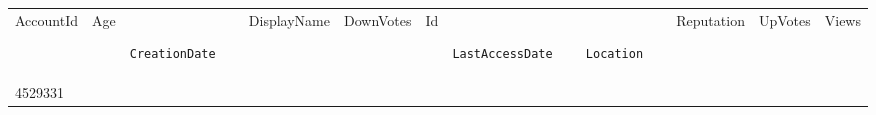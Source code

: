 \documentclass[12pt,a4paper,twoside,openright,titlepage,final]{article}
\begin{document}
\begin{enumerate}
	\begin{longtable}[]{@{}lllllllllll@{}}
		\toprule
		\begin{minipage}[t]{0.05\columnwidth}\raggedright\strut
			AccountId
			\strut\end{minipage} &
		\begin{minipage}[t]{0.03\columnwidth}\raggedright\strut
			Age
			\strut\end{minipage} &
		\begin{minipage}[t]{0.11\columnwidth}\raggedright\strut
			\begin{verbatim}
			CreationDate
			\end{verbatim}
			\strut\end{minipage} &
		\begin{minipage}[t]{0.08\columnwidth}\raggedright\strut
			DisplayName
			\strut\end{minipage} &
		\begin{minipage}[t]{0.05\columnwidth}\raggedright\strut
			DownVotes
			\strut\end{minipage} &
		\begin{minipage}[t]{0.03\columnwidth}\raggedright\strut
			Id
			\strut\end{minipage} &
		\begin{minipage}[t]{0.11\columnwidth}\raggedright\strut
			\begin{verbatim}
			LastAccessDate
			\end{verbatim}
			\strut\end{minipage} &
		\begin{minipage}[t]{0.11\columnwidth}\raggedright\strut
			\begin{verbatim}
			Location
			\end{verbatim}
			\strut\end{minipage} &
		\begin{minipage}[t]{0.06\columnwidth}\raggedright\strut
			Reputation
			\strut\end{minipage} &
		\begin{minipage}[t]{0.04\columnwidth}\raggedright\strut
			UpVotes
			\strut\end{minipage} &
		\begin{minipage}[t]{0.04\columnwidth}\raggedright\strut
			Views
			\strut\end{minipage}\tabularnewline
		\begin{minipage}[t]{0.05\columnwidth}\raggedright\strut
			4529331
			\strut\end{minipage} &

\end{longtable}
\end{enumerate}
\end{document}
